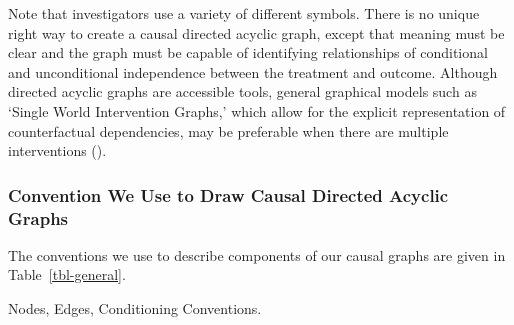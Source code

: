 \documentclass[
  single column]{article}
\begin{document}
Note that investigators use a variety of different symbols. There is no
unique right way to create a causal directed acyclic graph, except that
meaning must be clear and the graph must be capable of identifying
relationships of conditional and unconditional independence between the
treatment and outcome. Although directed acyclic graphs are accessible
tools, general graphical models such as `Single World Intervention
Graphs,' which allow for the explicit representation of counterfactual
dependencies, may be preferable when there are multiple interventions
().

\subsubsection{Convention We Use to Draw Causal Directed Acyclic
Graphs}\label{convention-we-use-to-draw-causal-directed-acyclic-graphs}

The conventions we use to describe components of our causal graphs are
given in Table~\ref{tbl-general}.

\begin{table}

\caption{\label{tbl-general}Nodes, Edges, Conditioning Conventions.}

\centering{

\terminologygeneraldags

}

\end{table}%
\end{document}
